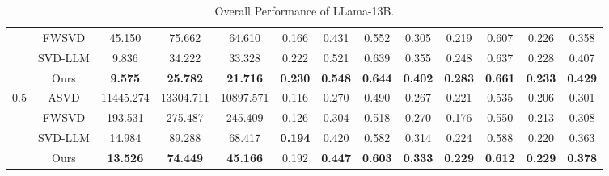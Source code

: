 \documentclass[11pt]{article}
\begin{document}
\begin{table}[ht]
{\begin{tabular}{cc|ccc|cccccccc}
 & FWSVD & 45.150 & 75.662 & 64.610 & 0.166 & 0.431 & 0.552 & 0.305 & 0.219 & 0.607 & 0.226 & 0.358 \\
 & SVD-LLM & 9.836 & 34.222 & 33.328 & 0.222 & 0.521 & 0.639 & 0.355 & 0.248 & 0.637 & 0.228 & 0.407 \\
 & Ours & \textbf{9.575} & \textbf{25.782} & \textbf{21.716} & \textbf{0.230} & \textbf{0.548} & \textbf{0.644} & \textbf{0.402} & \textbf{0.283} & \textbf{0.661} & \textbf{0.233} & \textbf{0.429} \\ \hline
\multirow{4}{*}{0.5} & ASVD & 11445.274 & 13304.711 & 10897.571 & 0.116 & 0.270 & 0.490 & 0.267 & 0.221 & 0.535 & 0.206 & 0.301 \\
 & FWSVD & 193.531 & 275.487 & 245.409 & 0.126 & 0.304 & 0.518 & 0.270 & 0.176 & 0.550 & 0.213 & 0.308 \\
 & SVD-LLM & 14.984 & 89.288 & 68.417 & \textbf{0.194} & 0.420 & 0.582 & 0.314 & 0.224 & 0.588 & 0.220 & 0.363 \\
 & Ours & \textbf{13.526} & \textbf{74.449} & \textbf{45.166} & 0.192 & \textbf{0.447} & \textbf{0.603} & \textbf{0.333} & \textbf{0.229} & \textbf{0.612} & \textbf{0.229} & \textbf{0.378} \\ \hline \hline
\end{tabular}
}
\caption{Overall Performance of LLama-13B.} 
\label{appendix_label4} 
\end{table}
\end{document}
